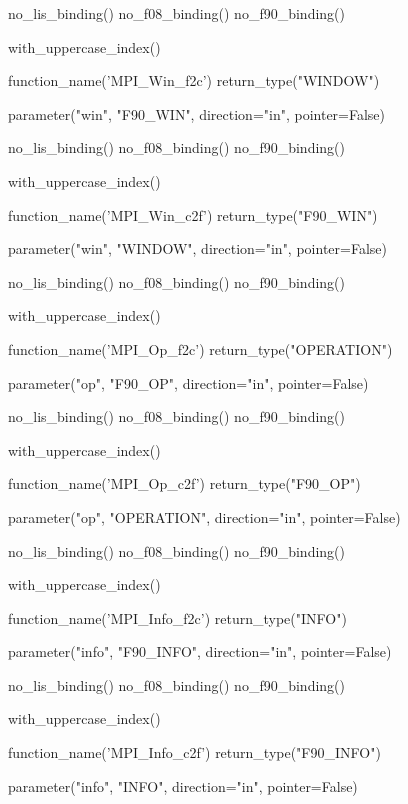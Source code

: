 %
\begin{mpi-binding}
    no_lis_binding()
    no_f08_binding()
    no_f90_binding()

    with_uppercase_index()

    function_name('MPI_Win_f2c')
    return_type("WINDOW")

    parameter("win", "F90_WIN", direction="in", pointer=False)
\end{mpi-binding}

%
\begin{mpi-binding}
    no_lis_binding()
    no_f08_binding()
    no_f90_binding()

    with_uppercase_index()

    function_name('MPI_Win_c2f')
    return_type("F90_WIN")

    parameter("win", "WINDOW", direction="in", pointer=False)
\end{mpi-binding}

%
\begin{mpi-binding}
    no_lis_binding()
    no_f08_binding()
    no_f90_binding()

    with_uppercase_index()

    function_name('MPI_Op_f2c')
    return_type("OPERATION")

    parameter("op", "F90_OP", direction="in", pointer=False)
\end{mpi-binding}

%
\begin{mpi-binding}
    no_lis_binding()
    no_f08_binding()
    no_f90_binding()

    with_uppercase_index()

    function_name('MPI_Op_c2f')
    return_type("F90_OP")

    parameter("op", "OPERATION", direction="in", pointer=False)
\end{mpi-binding}

%
\begin{mpi-binding}
    no_lis_binding()
    no_f08_binding()
    no_f90_binding()

    with_uppercase_index()

    function_name('MPI_Info_f2c')
    return_type("INFO")

    parameter("info", "F90_INFO", direction="in", pointer=False)
\end{mpi-binding}

%
\begin{mpi-binding}
    no_lis_binding()
    no_f08_binding()
    no_f90_binding()

    with_uppercase_index()

    function_name('MPI_Info_c2f')
    return_type("F90_INFO")

    parameter("info", "INFO", direction="in", pointer=False)
\end{mpi-binding}

